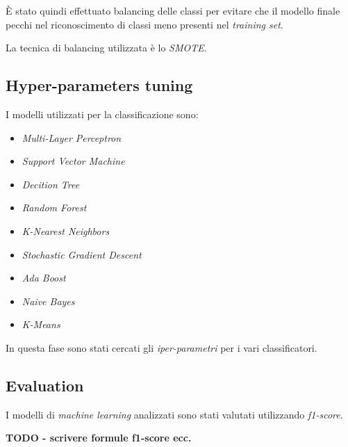                         \`E stato quindi effettuato balancing delle classi per evitare che il modello finale pecchi nel riconoscimento di classi meno presenti nel \textit{training set}.
                        
                        La tecnica di balancing utilizzata è lo \textit{SMOTE}.
                

        \subsection{Hyper-parameters tuning}
        
                I modelli utilizzati per la classificazione sono:
                \begin{itemize}
                        \item \textit{Multi-Layer Perceptron}
                        \item \textit{Support Vector Machine}
                        \item \textit{Decition Tree}
                        \item \textit{Random Forest}
                        \item \textit{K-Nearest Neighbors}
                        \item \textit{Stochastic Gradient Descent}
                        \item \textit{Ada Boost}
                        \item \textit{Naive Bayes}
                        \item \textit{K-Means}
                \end{itemize}
            
                In questa fase sono stati cercati gli \textit{iper-parametri} per i vari classificatori.
                

        \subsection{Evaluation}
        
                I modelli di \textit{machine learning} analizzati sono stati valutati utilizzando \textit{f1-score}.
                
                \textbf{TODO - scrivere formule f1-score ecc.}
                \bigbreak